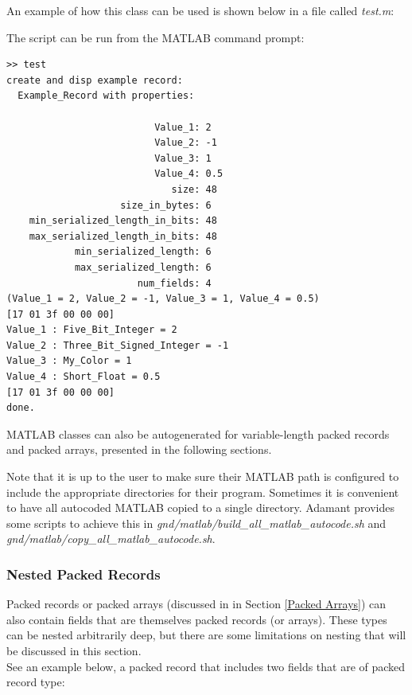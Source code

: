 An example of how this class can be used is shown below in a file called \textit{test.m}:


The script can be run from the MATLAB command prompt:

\vspace{5mm} %
\begin{verbatim}
>> test
create and disp example record:
  Example_Record with properties:

                          Value_1: 2
                          Value_2: -1
                          Value_3: 1
                          Value_4: 0.5
                             size: 48
                    size_in_bytes: 6
    min_serialized_length_in_bits: 48
    max_serialized_length_in_bits: 48
            min_serialized_length: 6
            max_serialized_length: 6
                       num_fields: 4
(Value_1 = 2, Value_2 = -1, Value_3 = 1, Value_4 = 0.5)
[17 01 3f 00 00 00]
Value_1 : Five_Bit_Integer = 2
Value_2 : Three_Bit_Signed_Integer = -1
Value_3 : My_Color = 1
Value_4 : Short_Float = 0.5
[17 01 3f 00 00 00]
done.
\end{verbatim}
\vspace{5mm} %

MATLAB classes can also be autogenerated for variable-length packed records and packed arrays, presented in the following sections.

Note that it is up to the user to make sure their MATLAB path is configured to include the appropriate directories for their program. Sometimes it is convenient to have all autocoded MATLAB copied to a single directory. Adamant provides some scripts to achieve this in \textit{gnd/matlab/build\_all\_matlab\_autocode.sh} and \textit{gnd/matlab/copy\_all\_matlab\_autocode.sh}.

\subsubsection{Nested Packed Records} \label{Nested Packed Records}

Packed records or packed arrays (discussed in in Section \ref{Packed Arrays}) can also contain fields that are themselves packed records (or arrays). These types can be nested arbitrarily deep, but there are some limitations on nesting that will be discussed in this section. \\

See an example below, a packed record that includes two fields that are of packed record type:

